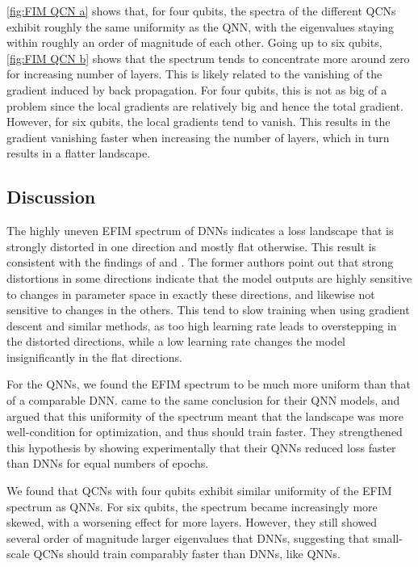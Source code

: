 \autoref{fig:FIM QCN a} shows that, for four qubits, the spectra of the different QCNs exhibit roughly the same uniformity as the QNN, with the eigenvalues staying within roughly an order of magnitude of each other. Going up to six qubits, \autoref{fig:FIM QCN b} shows that the spectrum tends to concentrate more around zero for increasing number of layers. This is likely related to the vanishing of the gradient induced by back propagation. For four qubits, this is not as big of a problem since the local gradients are relatively big and hence the total gradient. However, for six qubits, the local gradients tend to vanish. This results in the gradient vanishing faster when increasing the number of layers, which in turn results in a flatter landscape. 


\subsection{Discussion}\label{sec:Loss Landscape Discussion}
The highly uneven EFIM spectrum of DNNs indicates a loss landscape that is strongly distorted in one direction and mostly flat otherwise. This result is consistent with the findings of \citet{karakida2019universal} and \citet{abbas2020power}. The former authors point out that strong distortions in some directions indicate that the model outputs are highly sensitive to changes in parameter space in exactly these directions, and likewise not sensitive to changes in the others. This tend to slow training when using gradient descent and similar methods, as too high learning rate leads to overstepping in the distorted directions, while a low learning rate changes the model insignificantly in the flat directions. 

For the QNNs, we found the EFIM spectrum to be much more uniform than that of a comparable DNN. \citet{abbas2020power} came to the same conclusion for their QNN models, and argued that this uniformity of the spectrum meant that the landscape was more well-condition for optimization, and thus should train faster. They strengthened this hypothesis by showing experimentally that their QNNs reduced loss faster than DNNs for equal numbers of epochs. 

We found that QCNs with four qubits exhibit similar uniformity of the EFIM spectrum as QNNs. For six qubits, the spectrum became increasingly more skewed, with a worsening effect for more layers. However, they still showed several order of magnitude larger eigenvalues that DNNs, suggesting that small-scale QCNs should train comparably faster than DNNs, like QNNs.

